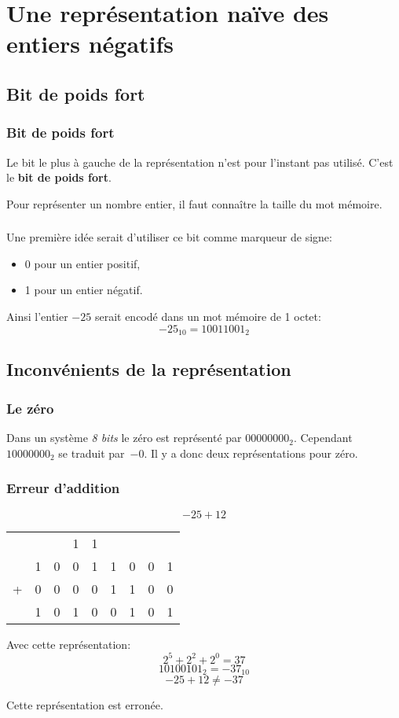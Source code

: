\documentclass[svgnames,11pt]{beamer}
\begin{document}
\section{Une représentation naïve des entiers négatifs}
\subsection{Bit de poids fort}
\begin{frame}
    \frametitle{Bit de poids fort}
    Le bit le plus à gauche de la représentation n'est pour l'instant pas utilisé. C'est le \textbf{bit de poids fort}.


\begin{aretenir}[]
Pour représenter un nombre entier, il faut connaître la taille du mot mémoire.
\end{aretenir}
\end{frame}
\begin{frame}
    \frametitle{}

    Une première idée serait d'utiliser ce bit comme marqueur de signe:
    \begin{itemize}
        \item 0 pour un entier positif,
        \item 1 pour un entier négatif.
    \end{itemize}
    Ainsi l'entier $-25$ serait encodé dans un mot mémoire de 1 octet:
    $$-25_{10} = 10011001_2$$

\end{frame}
\subsection{Inconvénients de la représentation}
\begin{frame}
    \frametitle{Le zéro}

    Dans un système \emph{8 bits} le zéro est représenté par $00000000_2$. Cependant $10000000_2$ se traduit par~$-0$. Il y a donc deux représentations pour zéro.

\end{frame}
\begin{frame}
    \frametitle{Erreur d'addition}
    $$-25+12$$
    \begin{center}
        \begin{tabular}{*{9}{c}}
              &   &   & {\small 1} & {\small 1} &   &   &   &   \\
              & 1 & 0 & 0          & 1          & 1 & 0 & 0 & 1 \\
            + & 0 & 0 & 0          & 0          & 1 & 1 & 0 & 0 \\
            \hline
              & 1 & 0 & 1          & 0          & 0 & 1 & 0 & 1 \\
        \end{tabular}
    \end{center}
    Avec cette représentation:
    $$2^5+2^2+2^0=37$$
    $$10100101_2 = -37_{10}$$
    $$-25+12\neq-37$$
    \begin{aretenir}[]
        Cette représentation est erronée.
    \end{aretenir}
\end{frame}
\end{document}
